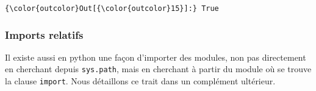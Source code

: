 \begin{Verbatim}[commandchars=\\\{\},frame=single,framerule=0.3mm,rulecolor=\color{cellframecolor}]
{\color{outcolor}Out[{\color{outcolor}15}]:} True
\end{Verbatim}
            
    \hypertarget{imports-relatifs}{%
\subsubsection{Imports relatifs}\label{imports-relatifs}}

    Il existe aussi en python une façon d'importer des modules, non pas
directement en cherchant depuis \texttt{sys.path}, mais en cherchant à
partir du module où se trouve la clause \texttt{import}. Nous détaillons
ce trait dans un complément ultérieur.


    
    
    
